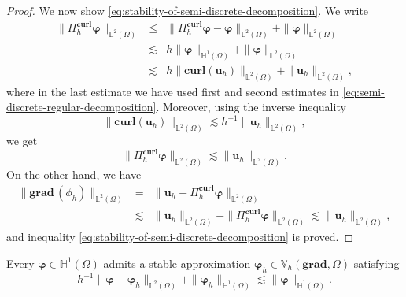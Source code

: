 \begin{proof}
We now show \eqref{eq:stability-of-semi-discrete-decomposition}. We write
\begin{eqnarray*}
\|\Pi_h^{\textbf{curl}} \bm{\varphi}\|_{\mathbb{L}^2(\Omega)} & \leq & \|\Pi_h^{\textbf{curl}} \bm{\varphi} -\bm{\varphi}\|_{\mathbb{L}^2(\Omega)}+\|\bm{\varphi}\|_{\mathbb{L}^2(\Omega)}\\
& \lesssim & h \|\bm{\varphi}\|_{\mathbb{H}^1(\Omega)} +  \|\bm{\varphi}\|_{\mathbb{L}^2(\Omega)}\\
& \lesssim &  h \|\textbf{curl}(\bm{u}_h)\|_{\mathbb{L}^2(\Omega)} + \|\bm{u}_h\|_{\mathbb{L}^2(\Omega)},
\end{eqnarray*}
where in the last estimate we have used first and second estimates in \eqref{eq:semi-discrete-regular-decomposition}. Moreover, using the inverse inequality 
\begin{equation}\label{eq:inverse-inequlity-curl}
\|\textbf{curl}(\bm{u}_h)\|_{\mathbb{L}^2(\Omega)} \lesssim h^{-1} \|\bm{u}_h\|_{\mathbb{L}^2(\Omega)},
\end{equation}
we get 
$$
\|\Pi_h^{\textbf{curl}} \bm{\varphi}\|_{\mathbb{L}^2(\Omega)} \lesssim \|\bm{u}_h\|_{\mathbb{L}^2(\Omega)}.
$$
On the other hand, we have 
\begin{eqnarray*}
\|\textbf{grad}\,(\phi_h)\|_{\mathbb{L}^2(\Omega)}  &=& \| \bm{u}_h - \Pi_h^{\textbf{curl}} \bm{\varphi}\|_{\mathbb{L}^2(\Omega)}\\
& \lesssim & \| \bm{u}_h \|_{\mathbb{L}^2(\Omega)} + \| \Pi_h^{\textbf{curl}} \bm{\varphi}\|_{\mathbb{L}^2(\Omega)} \lesssim \| \bm{u}_h \|_{\mathbb{L}^2(\Omega)},
\end{eqnarray*}
and  inequality \eqref{eq:stability-of-semi-discrete-decomposition} is proved.
\end{proof}

\begin{lemma}\label{lem-stable-approximation-of-vect-grad}
Every $\bm{\varphi} \in \mathbb{H}^1(\Omega)$ admits a stable approximation $\bm{\varphi}_h \in \mathbb{V}_h(\textbf{grad},\Omega)$ satisfying
$$
h^{-1} \|\bm{\varphi} -\bm{\varphi}_h \|_{\mathbb{L}^2(\Omega)} + \|\bm{\varphi}_h\|_{\mathbb{H}^1(\Omega)} \lesssim \|\bm{\varphi}\|_{\mathbb{H}^1(\Omega)}.
$$  
\end{lemma}

